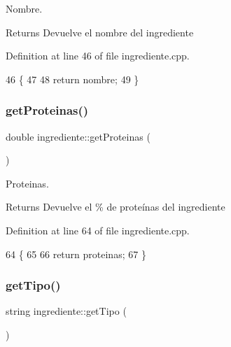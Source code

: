 Nombre. 

\begin{DoxyReturn}{Returns}
Devuelve el nombre del ingrediente 
\end{DoxyReturn}


Definition at line 46 of file ingrediente.\+cpp.


\begin{DoxyCode}
46                              \{
47 
48     \textcolor{keywordflow}{return} nombre;
49 \}
\end{DoxyCode}
\mbox{\label{classingrediente_aa6252c91568acf58332ec1a7202cd1c4}} 
\subsubsection{\texorpdfstring{get\+Proteinas()}{getProteinas()}}
{\footnotesize\ttfamily double ingrediente\+::get\+Proteinas (\begin{DoxyParamCaption}{ }\end{DoxyParamCaption})}



Proteinas. 

\begin{DoxyReturn}{Returns}
Devuelve el \% de proteínas del ingrediente 
\end{DoxyReturn}


Definition at line 64 of file ingrediente.\+cpp.


\begin{DoxyCode}
64                                 \{
65 
66     \textcolor{keywordflow}{return} proteinas;
67 \}
\end{DoxyCode}
\mbox{\label{classingrediente_a52fe74f041eba65a8c0a2e006a7686e0}} 
\subsubsection{\texorpdfstring{get\+Tipo()}{getTipo()}}
{\footnotesize\ttfamily string ingrediente\+::get\+Tipo (\begin{DoxyParamCaption}{ }\end{DoxyParamCaption})}



